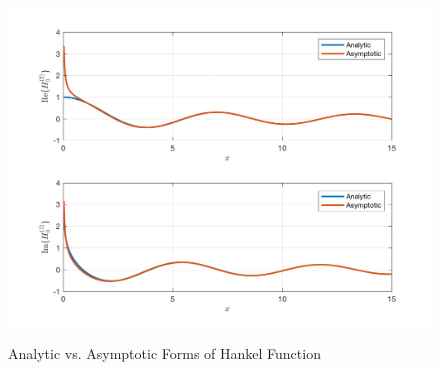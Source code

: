 \begin{figure}[H]
  \begin{center}
\includegraphics[width=5in]{../media/hankel_error.png}
\end{center}
  \renewcommand{\baselinestretch}{1}\small\normalsize
  \begin{quote}
    \caption[Analytic vs. Asymptotic Forms of Hankel Function]{Analytic vs. Asymptotic Forms of Hankel Function\label{sp_fig:3}}
  \end{quote}
\end{figure}
\renewcommand{\baselinestretch}{2} \small\normalsize
